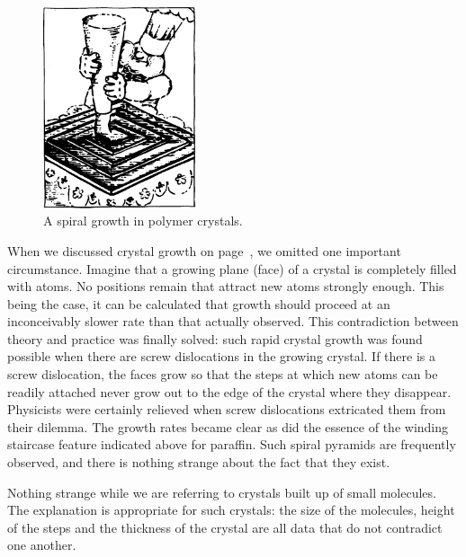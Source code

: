 \begin{figure}[!ht]
\centering
\includegraphics[width=0.4\textwidth]{figures/fig-09-05.pdf}
\caption{A spiral growth in polymer crystals.}
\label{fig-9.5}
\end{figure}

When we discussed crystal growth on page~\pageref{fig-4.6}, we omitted one important circumstance. Imagine that a growing plane (face) of a crystal is completely filled with atoms. No positions remain that attract new atoms strongly enough. This being the case, it can be calculated that growth should proceed at an inconceivably slower rate than that actually observed. This contradiction between theory and practice was finally solved: such rapid crystal growth was found possible when there are screw disloca­tions in the growing crystal. If there is a screw disloca­tion, the faces grow so that the steps at which new atoms can be readily attached never grow out to the edge of the crystal where they disappear. Physicists were certainly relieved when screw dislocations extricated them from their dilemma. The growth rates became clear as did the essence of the winding staircase feature indicated above for pa­raffin. Such spiral pyramids are frequently observed, and there is nothing strange about the fact that they exist.

Nothing strange while we are referring to crystals built up of small molecules. The explanation is appropri­ate for such crystals: the size of the molecules, height of the steps and the thickness of the crystal are all data that do not contradict one another.

